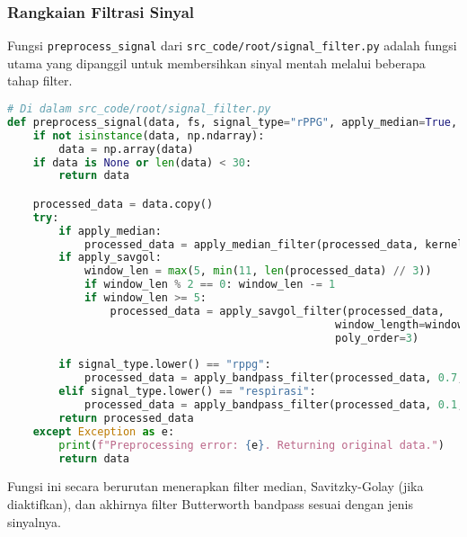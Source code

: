 \documentclass[11pt,a4paper]{article}
\begin{document}
\subsubsection{Rangkaian Filtrasi Sinyal}
Fungsi \texttt{preprocess\_signal} dari \texttt{src\_code/root/signal\_filter.py} adalah fungsi utama yang dipanggil untuk membersihkan sinyal mentah melalui beberapa tahap filter.
\begin{lstlisting}[language=Python, caption=Pipeline preprocessing sinyal dari \texttt{src\_code/root/signal\_filter.py}, label={lst:preprocess_signal}]
# Di dalam src_code/root/signal_filter.py
def preprocess_signal(data, fs, signal_type="rPPG", apply_median=True, apply_savgol=True):
    if not isinstance(data, np.ndarray):
        data = np.array(data)
    if data is None or len(data) < 30:
        return data 

    processed_data = data.copy()
    try:
        if apply_median:
            processed_data = apply_median_filter(processed_data, kernel_size=5)
        if apply_savgol:
            window_len = max(5, min(11, len(processed_data) // 3))
            if window_len % 2 == 0: window_len -= 1
            if window_len >= 5:
                processed_data = apply_savgol_filter(processed_data,
                                                   window_length=window_len,
                                                   poly_order=3)
        
        if signal_type.lower() == "rppg":
            processed_data = apply_bandpass_filter(processed_data, 0.7, 3.0, fs)
        elif signal_type.lower() == "respirasi":
            processed_data = apply_bandpass_filter(processed_data, 0.1, 0.5, fs)
        return processed_data
    except Exception as e:
        print(f"Preprocessing error: {e}. Returning original data.")
        return data
\end{lstlisting}
Fungsi ini secara berurutan menerapkan filter median, Savitzky-Golay (jika diaktifkan), dan akhirnya filter Butterworth bandpass sesuai dengan jenis sinyalnya.
\end{document}
